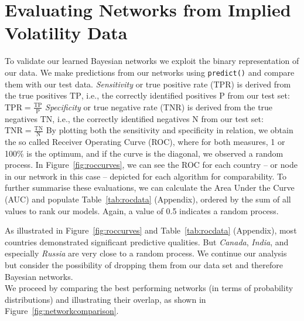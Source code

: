 \documentclass[twoside,twocolumn]{article}
\begin{document}
\section{Evaluating Networks from Implied Volatility Data}
\label{subsec:roc}
To validate our learned Bayesian networks we exploit the binary representation of our data. We make predictions from our networks using \texttt{predict()} and compare them with our test data. \newline \textit{Sensitivity} or true positive rate ($\mathrm{TPR}$) is derived from the true positives $\mathrm{TP}$,  i.e., the correctly identified positives $\mathrm{P}$ from our test set: 
$
\mathrm{TPR}=\frac{\mathrm{TP}}{\mathrm{P}}
$
\newline \textit{Specificity} or true negative rate ($\mathrm{TNR}$) is derived from the true negatives $\mathrm{TN}$,  i.e., the correctly identified negatives $\mathrm{N}$ from our test set: 
$
\mathrm{TNR}=\frac{\mathrm{TN}}{\mathrm{N}}
$
\newline By plotting both the sensitivity and specificity in relation, we obtain the so called Receiver Operating Curve (ROC), where for both measures, 1 or 100\% is the optimum, and if the curve is the diagonal, we observed a random process.  In Figure~\ref{fig:roccurves}, we can see the ROC for each country -- or node in our network in this case -- depicted for each algorithm for comparability. To further summarise these evaluations, we can calculate the Area Under the Curve (AUC) and populate Table~\ref{tab:rocdata} (Appendix),  ordered by the sum of all values to rank our models. Again, a value of 0.5 indicates a random process.  \cite{Hastie2009} \cite{Ertel2020}  \cite{Kauermann2021}  \cite{Russell2021}



As illustrated in Figure~\ref{fig:roccurves} and Table~\ref{tab:rocdata} (Appendix), most countries demonstrated significant predictive qualities. But \textsl{Canada}, \textsl{India}, and especially \textsl{Russia} are very close to a random process. We continue our analysis but consider the possibility of dropping them from our data set and therefore Bayesian networks. \\

We proceed by comparing the best performing networks (in terms of probability distributions) and illustrating their overlap, as shown in Figure~\ref{fig:networkcomparison}.
\end{document}

